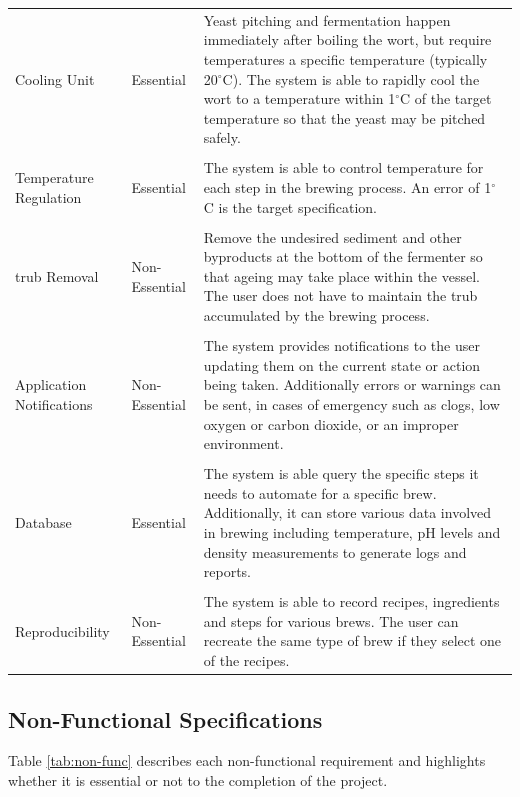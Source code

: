 \documentclass{article}
\begin{document}
\begin{table}[H]
\centering
\begin{tabularx}{\textwidth}{l l Z}
Cooling Unit
& Essential
& Yeast pitching and fermentation happen immediately after boiling the wort, but require temperatures a specific temperature (typically 20$^{\circ}$C). The system is able to rapidly cool the wort to a temperature within 1$^{\circ}$C of the target temperature so that the yeast may be pitched safely.
\\\\
Temperature Regulation
& Essential
& The system is able to control temperature for each step in the brewing process.  An error of 1$^{\circ}$C is the target specification.
\\\\
\Gls{trub} Removal
& Non-Essential
& Remove the undesired sediment and other byproducts at the bottom of the fermenter so that ageing may take place within the vessel.  The user does not have to maintain the \gls{trub} accumulated by the brewing process.
\\\\
Application Notifications
& Non-Essential
& The system provides notifications to the user updating them on the current state or action being taken.  Additionally errors or warnings can be sent, in cases of emergency such as clogs, low oxygen or carbon dioxide, or an improper environment.
\\\\
Database
& Essential
& The system is able query the specific steps it needs to automate for a specific brew.  Additionally, it can store various data involved in brewing including temperature, pH levels and density measurements to generate logs and reports.
\\\\
Reproducibility
& Non-Essential
& The system is able to record recipes, ingredients and steps for various brews. The user can recreate the same type of brew if they select one of the recipes.
\\
\bottomrule
\end{tabularx}
\label{tab:func}
\end{table}

\pagebreak
\subsection{Non-Functional Specifications}
Table \ref{tab:non-func} describes each non-functional requirement and highlights whether it is essential or not to the completion of the project.
\end{document}
